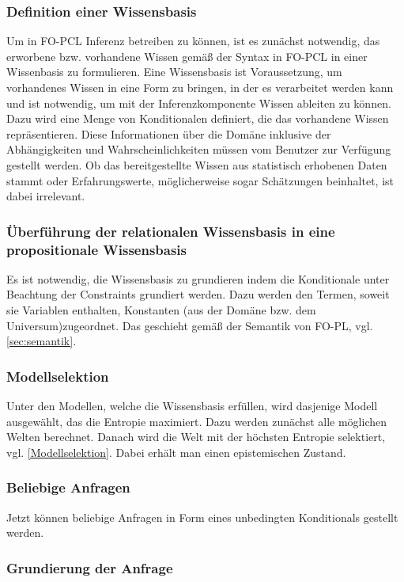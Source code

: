 \documentclass[a4paper, 11pt]{book}
\begin{document}
\subsubsection{Definition einer Wissensbasis}	
Um in FO-PCL Inferenz betreiben zu können, ist es zunächst notwendig, das erworbene bzw. vorhandene Wissen gemäß der Syntax in FO-PCL in einer Wissenbasis zu formulieren. Eine Wissensbasis ist Voraussetzung, um vorhandenes Wissen in eine Form zu bringen, in der es verarbeitet werden kann und ist notwendig, um mit der Inferenzkomponente Wissen ableiten zu können. Dazu wird eine Menge von Konditionalen definiert, die das vorhandene Wissen repräsentieren.  Diese Informationen über die Domäne inklusive der Abhängigkeiten und Wahrscheinlichkeiten müssen vom Benutzer zur Verfügung gestellt werden. Ob das bereitgestellte Wissen aus statistisch erhobenen Daten stammt oder Erfahrungswerte, möglicherweise sogar Schätzungen beinhaltet, ist dabei irrelevant.

\subsubsection{Überführung der relationalen Wissensbasis in eine propositionale Wissensbasis}
Es ist notwendig, die Wissensbasis zu grundieren indem die Konditionale unter Beachtung der Constraints grundiert werden. Dazu werden den Termen, soweit sie Variablen enthalten, Konstanten (aus der Domäne bzw. dem Universum)zugeordnet. Das geschieht gemäß der Semantik von FO-PL, vgl. \ref{sec:semantik}.
	
\subsubsection{Modellselektion}
Unter den Modellen, welche die Wissensbasis erfüllen, wird dasjenige Modell ausgewählt, das die Entropie maximiert. Dazu werden zunächst alle möglichen Welten berechnet. Danach wird die Welt mit der höchsten Entropie selektiert, vgl. \ref{Modellselektion}. Dabei erhält man einen epistemischen Zustand.
	
\subsubsection{Beliebige Anfragen}
Jetzt können beliebige Anfragen in Form eines unbedingten Konditionals gestellt werden.   

\subsubsection{Grundierung der Anfrage}
\end{document}
